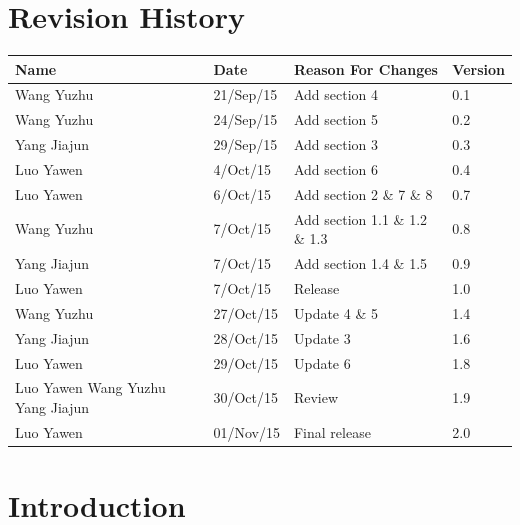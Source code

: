 \documentclass[11pt, a4paper]{article}
\begin{document}
\section*{Revision History}
\small
\begin{tabular} 
	 {|m{3cm}|m{2cm}|m{8cm}|m{2cm}|}
	\hline
	\textbf{Name} &  \textbf{Date} & \textbf{Reason For Changes} & \textbf{Version} \\ [0.5ex]
	\hline
	Wang Yuzhu & 21/Sep/15 & Add section 4 & 0.1\\ [0.5ex]
	\hline
	Wang Yuzhu & 24/Sep/15 & Add section 5 & 0.2 \\ [0.5ex]
	\hline
	Yang Jiajun & 29/Sep/15 & Add section 3 & 0.3 \\ [0.5ex]
	\hline
	Luo Yawen & 4/Oct/15 & Add section 6 & 0.4 \\ [0.5ex]
	\hline
	Luo Yawen & 6/Oct/15 & Add section 2 \& 7 \& 8 & 0.7 \\ [0.5ex]
	\hline
	Wang Yuzhu & 7/Oct/15 & Add section 1.1 \& 1.2 \& 1.3 & 0.8 \\ [0.5ex]
	\hline
	Yang Jiajun & 7/Oct/15 & Add section 1.4 \& 1.5 & 0.9\\ [0.5ex]
	\hline
	Luo Yawen & 7/Oct/15 & Release & 1.0 \\ [0.5ex]
	\hline
	Wang Yuzhu & 27/Oct/15 & Update 4 \& 5 & 1.4 \\ [0.5ex]
	\hline
	Yang Jiajun & 28/Oct/15 & Update 3  & 1.6 \\ [0.5ex]
	\hline
	Luo Yawen & 29/Oct/15 & Update 6 & 1.8 \\ [0.5ex]
	\hline
	Luo Yawen \newline Wang Yuzhu \newline Yang Jiajun & 30/Oct/15 & Review & 1.9 \\ [0.5ex]
	\hline
	Luo Yawen & 01/Nov/15 & Final release & 2.0 \\ [0.5ex]
	\hline
	
\end{tabular}
\cleardoublepage

\newpage


\setcounter{page}{1}

\section{Introduction}
\end{document}
